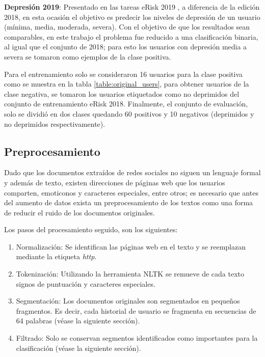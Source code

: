 \textbf{Depresión 2019}: Presentado en las tareas eRisk 2019 \cite{Losada2019}, a diferencia de la edición 2018, en esta ocasión el objetivo es predecir los niveles de depresión de un usuario (mínima, media, moderada, severa). Con el objetivo de que los resultados sean comparables, en este trabajo el problema fue reducido a una clasificación binaria, al igual que el conjunto de 2018; para esto los usuarios con depresión media a severa se tomaron como ejemplos de la clase positiva.

Para el entrenamiento solo se consideraron 16 usuarios para la clase positiva como se muestra en la tabla \ref{table:original_users}, para obtener usuarios de la clase negativa, se tomaron los usuarios etiquetados como no deprimidos del conjunto de entrenamiento eRisk 2018. Finalmente, el conjunto de evaluación, solo se dividió en dos clases quedando 60 positivos y 10 negativos (deprimidos y no deprimidos respectivamente).







\subsection{Preprocesamiento}

Dado que los documentos extraídos de redes sociales no siguen un lenguaje formal y además de texto, existen direcciones de páginas web que los usuarios comparten, emoticonos y caracteres especiales, entre otros; es necesario que antes del aumento de datos exista un preprocesamiento de los textos como una forma de reducir el ruido de los documentos originales.

Los pasos del procesamiento seguido, son los siguientes:

 \begin{enumerate}
     \item Normalización: Se identifican las páginas web en el texto y se reemplazan mediante la etiqueta \textit{http}.
     \item Tokenización: Utilizando la herramienta NLTK se remueve de cada texto signos de puntuación y caracteres especiales.
     \item Segmentación: Los documentos originales son segmentados en pequeños fragmentos. Es decir, cada historial de usuario se fragmenta en secuencias de 64 palabras  (véase la siguiente sección).
     \item Filtrado: Solo se conservan segmentos identificados como importantes para la clasificación (véase la siguiente sección).
 \end{enumerate}



